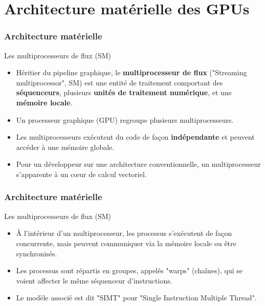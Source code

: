 \section{Architecture matérielle des GPUs}
\begin{frame}
    \frametitle{Architecture matérielle}
\begin{block}{Les multiprocesseurs de flux (SM)}
   \begin{itemize}
    \item<+-> Héritier du pipeline graphique, le \textbf{multiprocesseur de flux} ("Streaming multiprocessor", SM) 
    est une entité de traitement comportant des \textbf{séquenceurs}, plusieurs \textbf{unités de traitement numérique}, et une \textbf{mémoire locale}.
    \item<+-> Un processeur graphique (GPU) regroupe plusieurs multiprocesseurs. 
    \item<+-> Les multiprocesseurs exécutent du code de façon \textbf{indépendante} et peuvent accéder à
    une mémoire globale.
    \item<+-> Pour un développeur sur une architecture conventionnelle, un multiprocesseur s'apparente à un c{\oe}ur de calcul
    vectoriel.
   \end{itemize}
\end{block}
    

\end{frame}
\begin{frame}
    \frametitle{Architecture matérielle}
\begin{block}{Les multiprocesseurs de flux (SM)}
   \begin{itemize}
    \item<+->À l'intérieur d'un multiprocesseur, les processus s'exécutent de façon concurrente, mais peuvent communiquer
    via la mémoire locale ou être synchronisés.
    \item<+->Les processus sont répartis en groupes, appelés "warps" (chaînes), qui se voient affecter le même séquenceur 
    d'instructions.
    \item<+->Le modèle associé est dit "SIMT" pour "Single Instruction Multiple Thread".
   \end{itemize} 
\end{block}
\end{frame}
